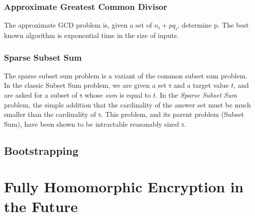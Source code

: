 \documentclass[a4paper,10pt]{article}
\begin{document}
\subsubsection{Approximate Greatest Common Divisor}
The approximate GCD problem is, given a set of $ n _{i} + pq_{i} $,
determine p. The best known algorithm is exponential time in the size
of inputs.


\subsubsection{Sparse Subset Sum}
The sparse subset sum problem is a variant of the common subset sum
problem. In the classic Subset Sum problem, we are given a set $
\mathbb{s} $ and a target value $t$, and are asked for a subset of $
\mathbb{s} $ whose \textit{sum} is equal to $t$. In the \textit{Sparse
  Subset Sum} problem, the simple addition that the cardinality of the
answer set must be much smaller than the cardinality of $ \mathbb{s}
$. This problem, and its parent problem (Subset Sum), have been shown
to be intractable reasonably sized $ \mathbb{s} $.

\subsection{Bootstrapping}

\section{Fully Homomorphic Encryption in the Future}

\pagebreak

\end{document}
